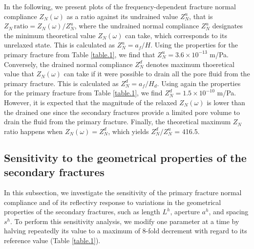 \documentclass[draft]{agujournal2019}
\begin{document}
In the following, we present plots of the frequency-dependent fracture normal compliance $Z_N (\omega)$ as a ratio against its undrained value $Z^u_{N}$, that is $Z_N\,\text{ratio} =Z_N (\omega)/ Z^u_{N}$, where the undrained normal compliance  $Z^u_{N}$ designates the minimum theoretical value $Z_N (\omega)$ can take, which corresponds to its unrelaxed state. This is calculated as $Z^u_{N}= a_f/H$. Using the properties for the primary fracture from Table \ref{table.1}, we  find that $Z^u_{N} =3.6 \times 10 ^{-13}$  m/Pa. Conversely, the drained normal compliance $Z^d_{N}$ denotes maximum thoeretical value that $Z_N (\omega)$ can take if it were possible to drain all the pore fluid from the primary fracture. This is calculated as
$Z^d_{N}= a_f/H_d$. Using again the properties for the primary fracture from Table \ref{table.1}, we find  $Z^d_{N} =1.5\times 10^{-10} $ m/Pa. However, it is expected that the magnitude of the relaxed $Z_N(\omega)$ is lower than the drained one since the secondary fractures provide a limited pore volume to drain the fluid from the primary fracture.
Finally, the theoretical maximum $Z_N$ ratio happens when  $Z_N (\omega) = Z^d_{N} $, which yields $Z^d_{N}/Z^u_{N}$ = 416.5. 


\subsection{Sensitivity to the geometrical properties of the secondary fractures}
In this subsection, we investigate the sensitivity of the primary fracture normal compliance and of its reflectivy response to variations in the geometrical properties of the secondary fractures, such as length $L^h$, aperture $a^h $, and spacing $s^h$. To perform this sensitivity analysis, we modify one parameter at a time by halving repeatedly its value to a maximum of 8-fold decrement with regard to its reference value (Table \ref{table.1}).
\end{document}
